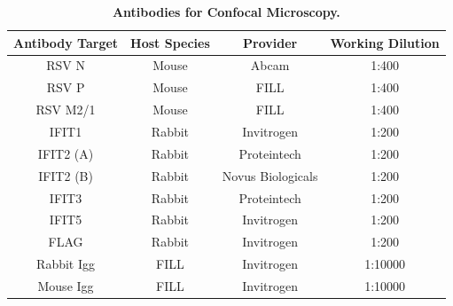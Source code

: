 \begin{table}
\centering
\begin{tabular}{@{}cccc@{}}
\toprule
\textbf{Antibody Target} & \textbf{Host Species} & \textbf{Provider} & \textbf{Working Dilution} \\ \midrule
RSV N       & Mouse  & Abcam             & 1:400   \\
RSV P       & Mouse  & FILL              & 1:400   \\
RSV   M2/1  & Mouse  & FILL              & 1:400   \\
IFIT1       & Rabbit & Invitrogen        & 1:200   \\
IFIT2   (A) & Rabbit & Proteintech       & 1:200   \\
IFIT2 (B)   & Rabbit & Novus Biologicals & 1:200   \\
IFIT3       & Rabbit & Proteintech       & 1:200   \\
IFIT5       & Rabbit & Invitrogen              & 1:200   \\
FLAG        & Rabbit & Invitrogen              & 1:200   \\
Rabbit Igg  & FILL   & Invitrogen              & 1:10000 \\
Mouse   Igg & FILL   & Invitrogen              & 1:10000 \\ \bottomrule
\end{tabular}
\caption[Antibodies for Confocal Microscopy.]{\textbf{Antibodies for Confocal Microscopy.}}
\label{tab:Antibodies for Confocal Microscopy}
\end{table}




